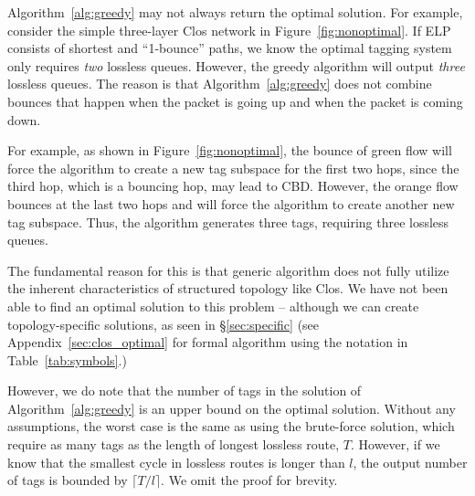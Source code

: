 Algorithm~\ref{alg:greedy} may not always return the optimal solution. For example,
consider the simple three-layer Clos network in Figure~\ref{fig:nonoptimal}.
If ELP consists of shortest and ``1-bounce'' paths,
we know the optimal tagging system only requires {\em two} lossless queues. However, the
greedy algorithm will output {\em three} lossless queues. The reason is that
Algorithm~\ref{alg:greedy} does not combine bounces that happen when the packet is going up
and when the packet is coming down.

For example, as shown in Figure~\ref{fig:nonoptimal}, the bounce of green flow
will force the algorithm to create a new tag subspace for the first two hops,
since the third hop, which is a bouncing hop, may lead to CBD.  However, the
orange flow bounces at the last two hops and will force the algorithm to create
another new tag subspace. Thus, the algorithm generates three tags, requiring
three lossless queues.

The fundamental reason for this is that generic algorithm does not fully utilize the
inherent characteristics of structured topology like Clos. We have not been able
to find an optimal solution to this problem -- although we can create
topology-specific solutions, as seen in \S\ref{sec:specific} (see
Appendix~\ref{sec:clos_optimal} for formal algorithm using the notation in
Table~\ref{tab:symbols}.)

However, we do note that the number of tags in the solution of
Algorithm~\ref{alg:greedy} is an upper bound on the optimal solution.  Without
any assumptions, the worst case is the same as using the brute-force solution,
which require as many tags as the length of longest lossless route, $T$.
However, if we know that the smallest cycle in lossless routes is longer than
$l$, the output number of tags is bounded by $\lceil T/l \rceil$. We omit the
proof for brevity.

